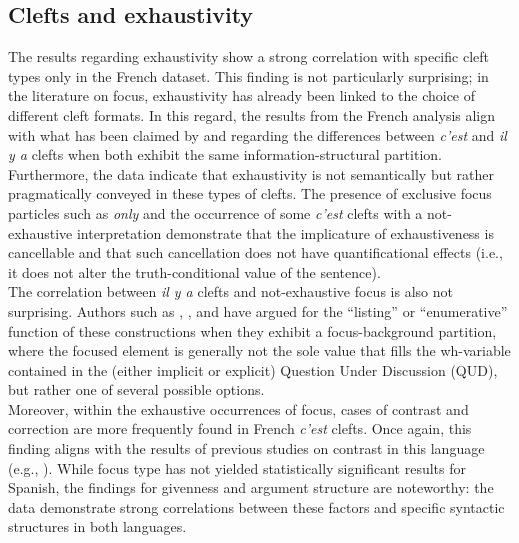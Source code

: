 \subsection{Clefts and exhaustivity}
The results regarding exhaustivity show a strong correlation with specific cleft types only in the French dataset. This finding is not particularly surprising; in the literature on focus, exhaustivity has already been linked to the choice of different cleft formats. In this regard, the results from the French analysis align with what has been claimed by \textcite{de2015status} and \textcite{karssenberg2017oiseaux} regarding the differences between \textit{c'est} and \textit{il y a} clefts when both exhibit the same information-structural partition.\\
Furthermore, the data indicate that exhaustivity is not semantically but rather pragmatically conveyed in these types of clefts. The presence of exclusive focus particles such as \textit{only} and the occurrence of some \textit{c'est} clefts with a not-exhaustive interpretation demonstrate that the implicature of exhaustiveness is cancellable and that such cancellation does not have quantificational effects (i.e., it does not alter the truth-conditional value of the sentence).\\
The correlation between \textit{il y a} clefts and not-exhaustive focus is also not surprising. Authors such as \textcite{de2015status}, \textcite{verwimp2017definite}, and \textcite{karssenberg2017oiseaux} have argued for the ``listing” or ``enumerative” function of these constructions when they exhibit a focus-background partition, where the focused element is generally not the sole value that fills the wh-variable contained in the (either implicit or explicit) Question Under Discussion (QUD), but rather one of several possible options.\\
Moreover, within the exhaustive occurrences of focus, cases of contrast and correction are more frequently found in French \textit{c'est} clefts. Once again, this finding aligns with the results of previous studies on contrast in this language (e.g., \cite{lambrecht1996information}).
While focus type has not yielded statistically significant results for Spanish, the findings for givenness and argument structure are noteworthy: the data demonstrate strong correlations between these factors and specific syntactic structures in both languages.

